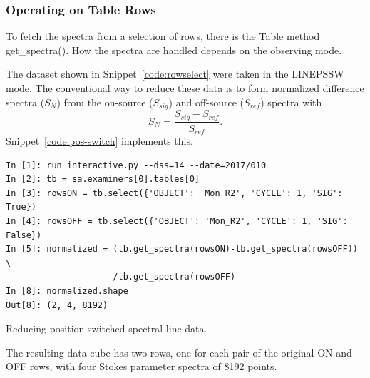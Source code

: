 \documentclass[letterpaper,11pt]{book}
\begin{document}
\subsubsection{Operating on Table Rows}

To fetch the spectra from a selection of rows, there is the {\ttfamily Table}
method {\ttfamily get\_spectra()}.  How the spectra are handled depends on the 
observing mode.  

The dataset shown in Snippet~\ref{code:rowselect} were taken in the
{\ttfamily LINEPSSW} mode. The conventional way to reduce these data is to
form normalized difference spectra ($S_N$) from the on-source ($S_{sig}$) and
off-source ($S_{ref}$) spectra with
\begin{displaymath}
S_N = \frac{S_{sig}-S_{ref}}{S_{ref}}.
\end{displaymath}
Snippet~\ref{code:pos-switch} implements this.
\begin{code}[h!tb]
\begin{center}
{\small \begin{verbatim}
In [1]: run interactive.py --dss=14 --date=2017/010
In [2]: tb = sa.examiners[0].tables[0]
In [3]: rowsON = tb.select({'OBJECT': 'Mon_R2', 'CYCLE': 1, 'SIG': True})
In [4]: rowsOFF = tb.select({'OBJECT': 'Mon_R2', 'CYCLE': 1, 'SIG': False})
In [5]: normalized = (tb.get_spectra(rowsON)-tb.get_spectra(rowsOFF)) \
                     /tb.get_spectra(rowsOFF)
In [8]: normalized.shape
Out[8]: (2, 4, 8192)\end{verbatim}
}\caption[Position switched data reduction]{\label{code:pos-switch}Reducing 
position-switched spectral line data.}
\end{center}
\end{code}
The resulting data cube has two rows, one for each pair of the original ON and 
OFF rows, with four Stokes parameter spectra of 8192 points.
\end{document}
